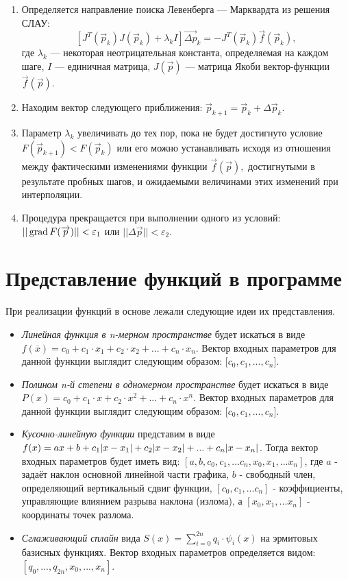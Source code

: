 \begin{enumerate}
	\item Определяется направление поиска Левенберга — Марквардта  из решения СЛАУ: 
	$$[J^{T}({\vec {p}}_{k})J({\vec {p}}_{k})+\lambda _{k}I]{\vec {\Delta p}}_{k}=-J^{T}({\vec {p}}_{k}){\vec {f}}({\vec {p}}_{k}),$$
	где $\lambda _{k}$ — некоторая неотрицательная константа, определяемая на каждом шаге, $I$ — единичная матрица, $J({\vec {p}})$ — матрица Якоби вектор-функции ${\vec {f}}({\vec {p}})$. 
	\item Находим вектор следующего приближения: $\vec {p}_{k+1}={\vec {p}}_{k}+{\Delta \vec {p}}_{k}.$
	\item Параметр $\lambda _{k}$  увеличивать до тех пор, пока не будет достигнуто условие $F({\vec {p}}_{k+1})<F({\vec {p}}_{k})$ или его можно устанавливать исходя из отношения между фактическими изменениями функции ${\vec {f}}({\vec {p}}),$ достигнутыми в результате пробных шагов, и ожидаемыми величинами этих изменений при интерполяции.
	\item Процедура прекращается при выполнении одного из условий: $|| \, \mathrm{grad} \, F(\overrightarrow{p})|| < \varepsilon_1$ или $|| \Delta \overrightarrow{p}|| < \varepsilon_2$.
\end{enumerate}



\section{Представление функций в программе}

При реализации функций в основе лежали следующие идеи их представления.

\begin{itemize}
	\item \textsl{Линейная функция в n-мерном пространстве} будет искаться в виде $f(\overline{x}) = c_0 + c_1 \cdot x_1 + c_2 \cdot x_2 + ... + c_n \cdot x_n$. Вектор входных параметров для данной функции выглядит следующим образом: [$c_0, c_1, ..., c_n$].
	\item \textsl{Полином n-й степени в одномерном пространстве} будет искаться в виде $P(x) = c_0 + c_1 \cdot x + c_2 \cdot x^2 + ... + c_n \cdot x^n$. Вектор входных параметров для данной функции выглядит следующим образом: [$c_0, c_1, ..., c_n$].
	\item \textsl{Кусочно-линейную функции} представим в виде $f(x) = ax + b + c_1 \abs{x - x_1} + c_2 \abs{x - x_2} + ... + c_n \abs{x - x_n}$. Тогда вектор входных параметров будет иметь вид: $[a, b, c_0, c_1, ... c_n, x_0, x_1, ... x_n]$, где $a$ - задаёт наклон основной линейной части графика, $b$ - свободный член, определяющий вертикальный сдвиг функции, $[c_0, c_1, ... c_n]$ - коэффициенты, управляющие влиянием разрыва наклона (излома), а $[x_0, x_1, ... x_n]$ - координаты точек разлома.
	\item \textsl{Сглаживающий сплайн} вида $S(x) = \sum_{i = 0}^{2n} q_i \cdot \psi_i(x)$ на эрмитовых базисных функциях. Вектор входных параметров определяется видом: $[q_0, ..., q_{2n}, x_0, ..., x_n]$.
\end{itemize}